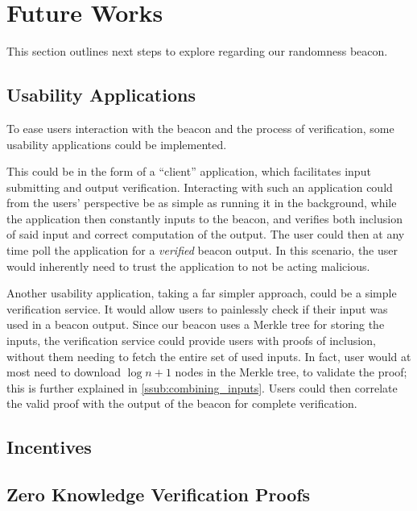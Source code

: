 \section{Future Works}%
\label{sec:future_works}
This section outlines next steps to explore regarding our randomness beacon.


\subsection{Usability Applications}%
\label{sub:usability_applications}
To ease users interaction with the beacon and the process of verification, some usability applications could be implemented.

This could be in the form of a \enquote{client} application, which facilitates input submitting and output verification.
Interacting with such an application could from the users' perspective be as simple as running it in the background, while the application then constantly inputs to the beacon, and verifies both inclusion of said input and correct computation of the output.
The user could then at any time poll the application for a \emph{verified} beacon output.
In this scenario, the user would inherently need to trust the application to not be acting malicious.

Another usability application, taking a far simpler approach, could be a simple verification service.
It would allow users to painlessly check if their input was used in a beacon output.
Since our beacon uses a Merkle tree for storing the inputs, the verification service could provide users with proofs of inclusion, without them needing to fetch the entire set of used inputs.
In fact, user would at most need to download $\log{n} + 1$ nodes in the Merkle tree, to validate the proof; this is further explained in \vref{ssub:combining_inputs}.
Users could then correlate the valid proof with the output of the beacon for complete verification.

\subsection{Incentives}

\subsection{Zero Knowledge Verification Proofs}%
\label{sub:zero_knowledge_verification_proofs}

